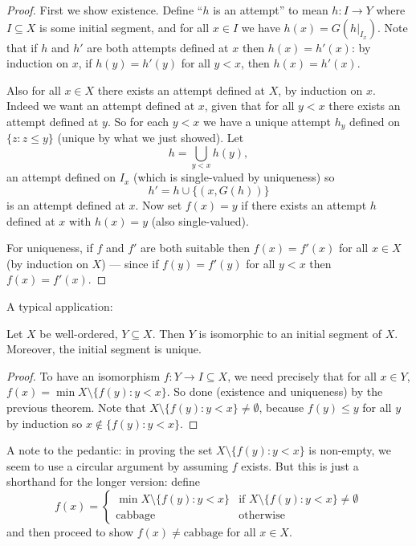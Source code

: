 \documentclass[a4paper]{article}
\begin{document}
\begin{proof}
  First we show existence. Define ``\(h\) is an attempt'' to mean \(h: I \to Y\) where \(I \subseteq X\) is some initial segment, and for all \(x \in I\) we have \(h(x) = G(h|_{I_x})\). Note that if \(h\) and \(h'\) are both attempts defined at \(x\) then \(h(x) = h'(x)\): by induction on \(x\), if \(h(y) = h'(y)\) for all \(y < x\), then \(h(x) = h'(x)\).

  Also for all \(x \in X\) there exists an attempt defined at \(X\), by induction on \(x\). Indeed we want an attempt defined at \(x\), given that for all \(y < x\) there exists an attempt defined at \(y\). So for each \(y < x\) we have a unique attempt \(h_y\) defined on \(\{z: z\leq y\}\) (unique by what we just showed). Let
  \[
    h = \bigcup_{y < x} h(y),
  \]
  an attempt defined on \(I_x\) (which is single-valued by uniqueness) so
  \[
    h' = h \cup \{(x, G(h))\}
  \]
  is an attempt defined at \(x\). Now set \(f(x) = y\) if there exists an attempt \(h\) defined at \(x\) with \(h(x) = y\) (also single-valued).

  For uniqueness, if \(f\) and \(f'\) are both suitable then \(f(x) = f'(x)\) for all \(x \in X\) (by induction on \(X\)) --- since if \(f(y) = f'(y)\) for all \(y < x\) then \(f(x) = f'(x)\).
\end{proof}

A typical application:

\begin{proposition}
  Let \(X\) be well-ordered, \(Y \subseteq X\). Then \(Y\) is isomorphic to an initial segment of \(X\). Moreover, the initial segment is unique.
\end{proposition}

\begin{proof}
  To have an isomorphism \(f: Y \to I \subseteq X\), we need precisely that for all \(x \in Y\), \(f(x) = \min X \setminus \{f(y): y < x\}\). So done (existence and uniqueness) by the previous theorem. Note that \(X \setminus \{f(y): y < x\} \neq \emptyset\), because \(f(y) \leq y\) for all \(y\) by induction so \(x \notin \{f(y): y < x\}\).
\end{proof}

A note to the pedantic: in proving the set \(X \setminus \{f(y): y < x\}\) is non-empty, we seem to use a circular argument by assuming \(f\) exists. But this is just a shorthand for the longer version: define
\[
  f(x) =
  \begin{cases}
    \min X \setminus \{f(y): y < x\} & \text{if } X \setminus \{f(y): y < x\} \neq \emptyset \\
    \text{cabbage} & \text{otherwise}
  \end{cases}
\]
and then proceed to show \(f(x) \neq \text{cabbage}\) for all \(x \in X\).
\end{document}
